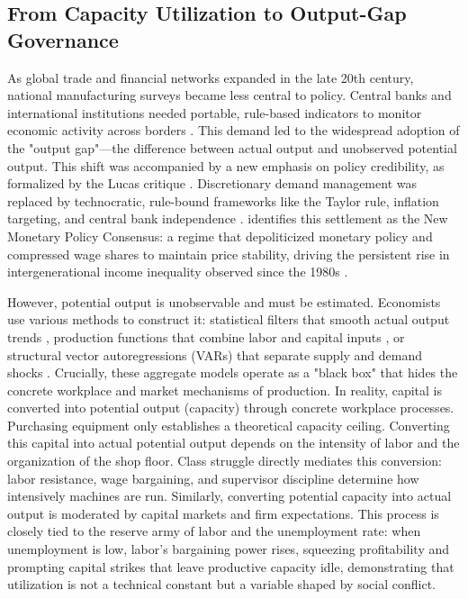 \documentclass[11pt]{article}
\begin{document}
\subsection{From Capacity Utilization to Output-Gap Governance}
\label{subsec:output_gap_governance}

As global trade and financial networks expanded in the late 20th century, national manufacturing surveys became less central to policy. Central banks and international institutions needed portable, rule-based indicators to monitor economic activity across borders \citep{Jessop2002, Jessop2003, Konings2007}. This demand led to the widespread adoption of the "output gap"—the difference between actual output and unobserved potential output. This shift was accompanied by a new emphasis on policy credibility, as formalized by the Lucas critique \citep{Johnson2024}. Discretionary demand management was replaced by technocratic, rule-bound frameworks like the Taylor rule, inflation targeting, and central bank independence \citep{Taylor1993, Johnson2024}. \citet{SaadFilho2018} identifies this settlement as the New Monetary Policy Consensus: a regime that depoliticized monetary policy and compressed wage shares to maintain price stability, driving the persistent rise in intergenerational income inequality observed since the 1980s \citep{HickelEtAl2026, Foster2024}.

However, potential output is unobservable and must be estimated. Economists use various methods to construct it: statistical filters that smooth actual output trends \citep{HodrickPrescott1997, BaxterKing1999, BeveridgeNelson1981, Hamilton2018}, production functions that combine labor and capital inputs \citep{CBO2004PotentialGDP, HavikEtAl2014, Alichi2015}, or structural vector autoregressions (VARs) that separate supply and demand shocks \citep{BlanchardQuah1989}. Crucially, these aggregate models operate as a "black box" that hides the concrete workplace and market mechanisms of production. In reality, capital is converted into potential output (capacity) through concrete workplace processes. Purchasing equipment only establishes a theoretical capacity ceiling. Converting this capital into actual potential output depends on the intensity of labor and the organization of the shop floor. Class struggle directly mediates this conversion: labor resistance, wage bargaining, and supervisor discipline determine how intensively machines are run. Similarly, converting potential capacity into actual output is moderated by capital markets and firm expectations. This process is closely tied to the reserve army of labor and the unemployment rate: when unemployment is low, labor's bargaining power rises, squeezing profitability and prompting capital strikes that leave productive capacity idle, demonstrating that utilization is not a technical constant but a variable shaped by social conflict.
\end{document}
